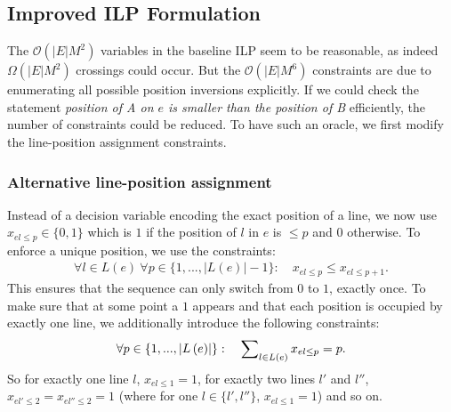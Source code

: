 \documentclass[sigconf]{acmart}
\begin{document}
%
\subsection{Improved ILP Formulation}\label{SEC:improved}
%
The $\mathcal{O}(|E|M^{2})$ variables in the baseline ILP seem to be reasonable, as indeed $\Omega(|E|M^{2})$ crossings could occur. But the $\mathcal{O}(|E|M^{6})$ constraints are due to enumerating all possible position inversions explicitly. If we could check the statement \emph{position of A on $e$ is smaller than the position of B} efficiently, the number of constraints could be reduced. To have such an oracle, we first modify the line-position assignment constraints.

\subsubsection{Alternative line-position assignment}
Instead of a decision variable encoding the exact position of a line, we now use $x_{el\leq p} \in \{0,1\}$ which is $1$ if the position of $l$ in $e$ is $\leq p$ and $0$ otherwise. To enforce a unique position, we use the constraints:
\begin{align}
	\forall l \in L(e)~ \forall p \in \{1, ..., \left|L\left(e\right)\right|-1\}: \quad x_{el\leq p} \leq x_{el\leq p+1}. \label{EQ:up_constr}
\end{align}
This ensures that the sequence can only switch from $0$ to $1$, exactly once. To make sure that at some point a $1$ appears and that each position is occupied by exactly one line, we additionally introduce the following constraints:
\begin{align}
	\forall p \in \{1, ..., \left|L\left(e\right)\right|\}: \quad  \sum\nolimits_{l \in L(e)} x_{el\leq p} = p. \label{EQ:01_constr}
\end{align}
So for exactly one line $l$, $x_{el\leq 1} = 1$, for exactly two lines $l'$ and $l''$, $x_{el'\leq 2} = x_{el''\leq 2} = 1$ (where for one $l \in \{l',l''\}$, $x_{el\leq 1} =1$) and so on.
\end{document}
